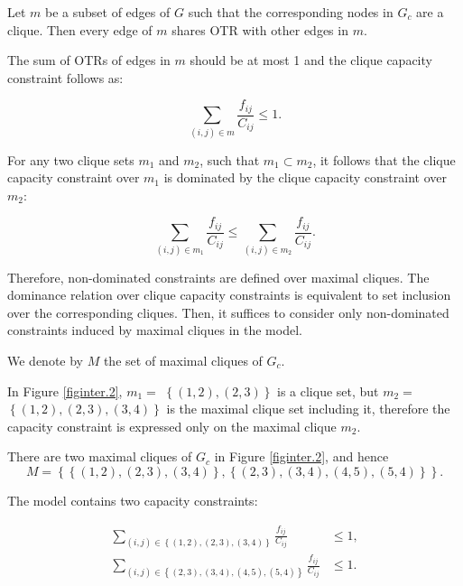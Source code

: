 Let \(m\) be a subset of edges of \(G\) such that the corresponding nodes in \(G_c\) are a clique. Then every edge of \(m\) shares OTR with other edges in \(m\).

The sum of  OTRs of edges in \(m\) should be at most 1 and the clique capacity constraint follows as:
 
\begin{equation}\sum_{(i,j) \in m}\frac{f_{ij}}{C_{ij}} \le 1.
\end{equation}

 For any two clique sets \(m_1 \) and \(m_2\), such that \(m_1 \subset m_2\), it follows that the clique capacity constraint over \(m_1\) is dominated by the clique capacity constraint over \(m_2\):  

\begin{equation}\sum_{(i,j) \in m_1}\frac{f_{ij}}{C_{ij}} \le \sum_{(i,j) \in m_2}\frac{f_{ij}}{C_{ij}}.
\end{equation}

Therefore, non-dominated constraints are defined over maximal cliques. The dominance relation over clique capacity constraints is equivalent to set inclusion over the corresponding cliques. Then, it suffices to consider only non-dominated constraints induced by maximal cliques in the model.  

We denote by \(M\) the set of maximal cliques of \(G_c\).

In Figure \eqref{figinter.2}, \(m_1 = \) \(\left \{(1,2), (2,3) \right\}\) is a clique set, but  \(m_2 =  \)\(\left \{(1,2), (2,3), (3,4)\right\}\) is the maximal clique set including it, therefore the capacity constraint is expressed only on the maximal clique \(m_2\). 

There are two maximal cliques of \(G_c\) in Figure \eqref{figinter.2}, and hence
\begin{equation*}
M = \left\{\left \{ (1,2),(2,3),(3,4) \right\}, \left\{(2,3),(3,4), (4,5), (5,4) \right \} \right\}.
\end{equation*}


The model contains two capacity constraints:

\begin{equation*}
    \begin{split}
        \sum_{(i,j) \in \left \{ (1,2), (2,3), (3,4) \right \}} \frac{f_{ij}}{C_{ij}} &\le 1, \\
        \sum_{(i,j) \in \left \{ (2,3),(3,4), (4,5), (5,4) \right \}} \frac{f_{ij}}{C_{ij}} &\le 1.
    \end{split}
\end{equation*}


